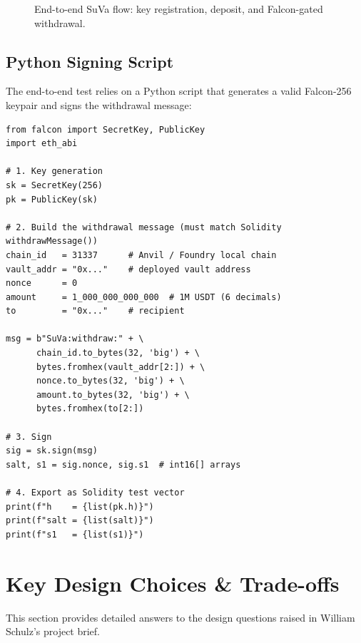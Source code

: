 \documentclass[11pt,a4paper]{article}
\begin{document}
\begin{figure}[H]
\caption{End-to-end SuVa flow: key registration, deposit, and Falcon-gated withdrawal.}
\end{figure}

\subsection{Python Signing Script}

The end-to-end test relies on a Python script that generates a valid Falcon-256 keypair and signs the withdrawal message:

\begin{lstlisting}[style=python, caption={Withdrawal message signing (Python)}]
from falcon import SecretKey, PublicKey
import eth_abi

# 1. Key generation
sk = SecretKey(256)
pk = PublicKey(sk)

# 2. Build the withdrawal message (must match Solidity withdrawMessage())
chain_id   = 31337      # Anvil / Foundry local chain
vault_addr = "0x..."    # deployed vault address
nonce      = 0
amount     = 1_000_000_000_000  # 1M USDT (6 decimals)
to         = "0x..."    # recipient

msg = b"SuVa:withdraw:" + \
      chain_id.to_bytes(32, 'big') + \
      bytes.fromhex(vault_addr[2:]) + \
      nonce.to_bytes(32, 'big') + \
      amount.to_bytes(32, 'big') + \
      bytes.fromhex(to[2:])

# 3. Sign
sig = sk.sign(msg)
salt, s1 = sig.nonce, sig.s1  # int16[] arrays

# 4. Export as Solidity test vector
print(f"h    = {list(pk.h)}")
print(f"salt = {list(salt)}")
print(f"s1   = {list(s1)}")
\end{lstlisting}

\newpage
\section{Key Design Choices \& Trade-offs}

This section provides detailed answers to the design questions raised in William Schulz's project brief.
\end{document}
